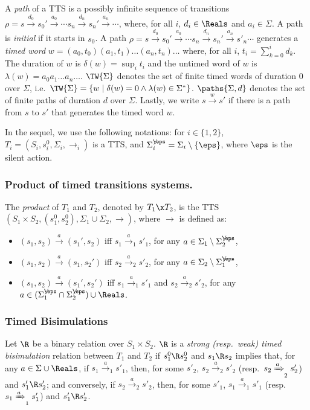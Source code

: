 \documentclass{LMCS}
\theoremstyle{plain}\newtheorem*{prop11}{Proposition~\ref{prop:states} bis}
\begin{document}
A \emph{path} of a TTS is a possibly infinite sequence of transitions
$\rho = s\xrightarrow{d_0}s_0'\xrightarrow{a_0}\cdots
s_n\xrightarrow{d_n}s_n'\xrightarrow{a_n}\cdots$, where, for all $i$,
$d_i\in\Reals$ and $a_i\in\Sigma$.
A path is \emph{initial} if it starts in $s_0$.
A path $\rho = s\xrightarrow{d_0}s_0'\xrightarrow{a_0}\cdots
s_n\xrightarrow{d_n}s_n'\xrightarrow{a_n}s'_n\cdots$ generates a
\emph{timed word} \mbox{$w=(a_0,t_0)(a_1,t_1)\dots(a_n,t_n)\dots$} where, for
all $i$, $t_i=\sum_{k=0}^i d_k$. The duration of $w$ is
$\delta(w)=\sup_i t_i$ and the untimed word of $w$ is
$\lambda(w)=a_0 a_1 \dots a_n\dots$. $\TW{\Sigma}$ denotes the set of finite timed words of duration $0$
over $\Sigma$, i.e.\ $\TW{\Sigma}=\{w\mid\delta(w)=0\land\lambda(w)\in\Sigma^*\}$. $\paths{\Sigma,d}$ denotes the set of finite paths of duration $d$
over $\Sigma$.
Lastly, we write $s\xrightarrow{w}s'$ if there is a path from $s$ to $s'$
that generates the timed word $w$.

In the sequel, we use the following notations: for $i\in\{1,2\}$,
$T_i = (S_i, s_i^0, \Sigma_i,{\rightarrow_i})$ is a TTS, and
$\Sigma_{i}^{\not\eps}=\Sigma_i\setminus\{\eps\}$, where $\eps$
is the silent action.

\subsubsection*{Product of timed transitions systems.}
The \emph{product} of $T_1$ and $T_2$, denoted by $T_1\x T_2$, is the TTS
\mbox{$\left(S_1\times S_2, (s_1^0, s_2^0), \Sigma_1\cup\Sigma_2, {\rightarrow}\right)$},
where ${\rightarrow}$ is defined as:
\begin{itemize}
  \item $(s_1,s_2)\xrightarrow{a}(s_1',s_2)$ iff $s_1\xrightarrow{a}_1 s'_1$,
  for any $a\in\Sigma_1\setminus\Sigma_{2}^{\not\eps}$,
  \item $(s_1,s_2)\xrightarrow{a}(s_1,s_2')$ iff $s_2\xrightarrow{a}_2 s'_2$,
  for any $a\in\Sigma_2\setminus\Sigma_{1}^{\not\eps}$,
  \item $(s_1,s_2)\xrightarrow{a}(s_1',s_2')$ iff $s_1\xrightarrow{a}_1 s'_1$
  and $s_2\xrightarrow{a}_2 s'_2$, for any $a\in(\Sigma_{1}^{\not\eps}\cap\Sigma_{2}^{\not\eps})\cup\Reals$.
\end{itemize}


\subsubsection*{Timed Bisimulations}
Let ${\R}$ be a binary relation over $S_1 \times S_2$.
${\R}$ is a
\emph{strong (resp.\ weak) timed bisimulation} relation between $T_1$ and $T_2$ if
$s_1^0\R s_2^0$ and $s_1\R s_2$ implies that, for any
$a \in \Sigma\cup \Reals$,
if $s_1\xrightarrow{a}_1 s'_1$, then, for some $s'_2$,
  $s_2\xrightarrow{a}_2 s'_2$ (resp.\ $s_2\xRightarrow{a}_2 s'_2$) and
  $s'_1\R s'_2$;
  and conversely, if $s_2\xrightarrow{a}_2 s'_2$, then, for some $s'_1$,
  $s_1\xrightarrow{a}_1 s'_1$ (resp.\ $s_1\xRightarrow{a}_1 s'_1$) and $s'_1\R s'_2$.
\end{document}
